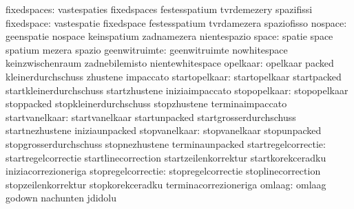                      fixedspaces: vastespaties                     fixedspaces
                                  festesspatium                    tvrdemezery
                                  spazifissi
                      fixedspace: vastespatie                      fixedspace
                                  festesspatium                    tvrdamezera
                                  spaziofisso
                         nospace: geenspatie                       nospace
                                  keinspatium                      zadnamezera
                                  nientespazio
                           space: spatie                           space
                                  spatium                          mezera
                                  spazio
                   geenwitruimte: geenwitruimte                    nowhitespace
                                  keinzwischenraum                 zadnebilemisto
                                  nientewhitespace
                        opelkaar: opelkaar                         packed
                                  kleinerdurchschuss               zhustene
                                  impaccato
                   startopelkaar: startopelkaar                    startpacked
                                  startkleinerdurchschuss          startzhustene
                                  iniziaimpaccato
                    stopopelkaar: stopopelkaar                     stoppacked
                                  stopkleinerdurchschuss           stopzhustene
                                  terminaimpaccato
                  startvanelkaar: startvanelkaar                   startunpacked
                                  startgrosserdurchschuss          startnezhustene
                                  iniziaunpacked                   %
                   stopvanelkaar: stopvanelkaar                    stopunpacked
                                  stopgrosserdurchschuss           stopnezhustene
                                  terminaunpacked
             startregelcorrectie: startregelcorrectie              startlinecorrection
                                  startzeilenkorrektur             startkorekceradku
                                  iniziacorrezioneriga
              stopregelcorrectie: stopregelcorrectie               stoplinecorrection
                                  stopzeilenkorrektur              stopkorekceradku
                                  terminacorrezioneriga
                          omlaag: omlaag                           godown
                                  nachunten                        jdidolu
